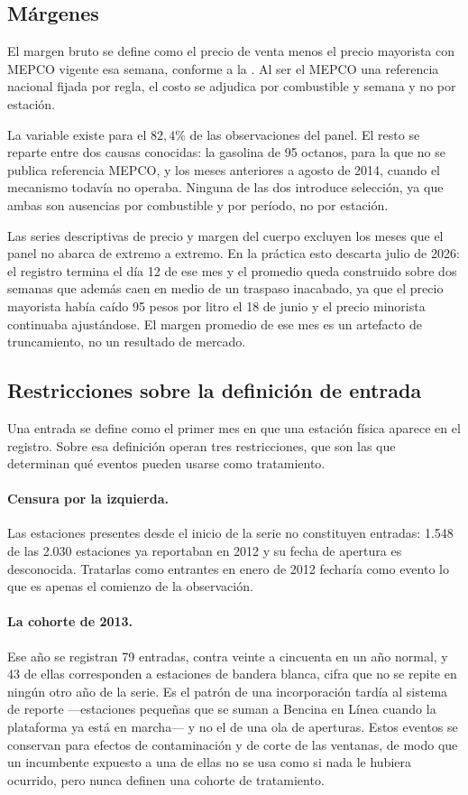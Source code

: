 \subsection{Márgenes}

El margen bruto se define como el precio de venta menos el precio mayorista con
MEPCO vigente esa semana, conforme a la . Al ser el MEPCO una
referencia nacional fijada por regla, el costo se adjudica por combustible y
semana y no por estación.

La variable existe para el $82{,}4\%$ de las observaciones del panel. El resto
se reparte entre dos causas conocidas: la gasolina de 95 octanos, para la que no
se publica referencia MEPCO, y los meses anteriores a agosto de 2014, cuando el
mecanismo todavía no operaba. Ninguna de las dos introduce selección, ya que
ambas son ausencias por combustible y por período, no por estación.

Las series descriptivas de precio y margen del cuerpo excluyen los meses que el
panel no abarca de extremo a extremo. En la práctica esto descarta julio de
2026: el registro termina el día 12 de ese mes y el promedio queda construido
sobre dos semanas que además caen en medio de un traspaso inacabado, ya que el
precio mayorista había caído 95 pesos por litro el 18 de junio y el precio
minorista continuaba ajustándose. El margen promedio de ese mes es un artefacto
de truncamiento, no un resultado de mercado.

\subsection{Restricciones sobre la definición de entrada}

Una entrada se define como el primer mes en que una estación física aparece en
el registro. Sobre esa definición operan tres restricciones, que son las que
determinan qué eventos pueden usarse como tratamiento.

\paragraph{Censura por la izquierda.} Las estaciones presentes desde el inicio
de la serie no constituyen entradas: 1.548 de las 2.030 estaciones ya reportaban
en 2012 y su fecha de apertura es desconocida. Tratarlas como entrantes en enero
de 2012 fecharía como evento lo que es apenas el comienzo de la observación.

\paragraph{La cohorte de 2013.} Ese año se registran 79 entradas, contra veinte
a cincuenta en un año normal, y 43 de ellas corresponden a estaciones de bandera
blanca, cifra que no se repite en ningún otro año de la serie. Es el patrón de
una incorporación tardía al sistema de reporte —estaciones pequeñas que se
suman a Bencina en Línea cuando la plataforma ya está en marcha— y no el de una
ola de aperturas. Estos eventos se conservan para efectos de contaminación y de
corte de las ventanas, de modo que un incumbente expuesto a una de ellas no se
usa como si nada le hubiera ocurrido, pero nunca definen una cohorte de
tratamiento.

